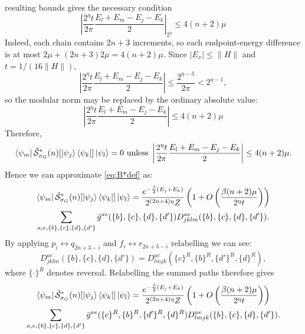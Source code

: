 \documentclass[aps,floatfix,10pt,amssymb,amsfont,amsmath,superscriptaddress,float,nofootinbib,longbibliography,nobalancelastpage,twocolumn]{revtex4-2}
\begin{document}
\begin{widetext}
resulting bounds gives the necessary condition
\begin{equation}
    \left|\frac{2^{\eta}t}{2\pi}\frac{E_l+E_m-E_j-E_k}{2}\right|_{2^{\eta}} \leq 4(n+2)\mu
\end{equation}
Indeed, each chain contains $2n+3$ increments, so each endpoint-energy
difference is at most $2\mu+(2n+3)2\mu=4(n+2)\mu$.  Since
$|E_x|\leq\|H\|$ and $t=1/(16\|H\|)$,
\begin{equation*}
    \left|\frac{2^{\eta}t}{2\pi}\frac{E_l+E_m-E_j-E_k}{2}\right|
    \leq \frac{2^{\eta-3}}{2\pi}<2^{\eta-1},
\end{equation*}
so the modular norm may be replaced by the ordinary absolute value:
\begin{equation}
\label{eq:energiessame}
    \left|\frac{2^{\eta}t}{2\pi}\frac{E_l+E_m-E_j-E_k}{2}\right| \leq 4(n+2)\mu
\end{equation}
Therefore,
\begin{equation}
    \bra{\psi_m}\tilde{\mathcal{S}}^*_{\sigma_G}(n)[\ket{\psi_j}\bra{\psi_k}]\ket{\psi_l} = 0 \text{ unless } \left|\frac{2^{\eta}t}{2\pi}\frac{E_l+E_m-E_j-E_k}{2}\right| \leq 4(n+2)\mu.
\end{equation}
Hence we can approximate \eqref{eq:B*def} as:
\begin{multline}
     \bra{\psi_m}\tilde{\mathcal{S}}^*_{\sigma_G}(n)[\ket{\psi_j}\bra{\psi_k}]\ket{\psi_l} = \frac{e^{-\frac{\beta}{2}(E_j+E_k)}}{2^{(2n+4)\eta}Z}\left(1+O\left(\frac{\beta(n+2)\mu}{2^\eta t}\right)\right)\\\sum_{a,e,\{b\},\{c\},\{d\},\{d'\}} \bar g^{ae}(\{b\},\{c\},\{d\},\{d'\}) D^{ae}_{jklm}(\{b\},\{c\},\{d\},\{d'\}).
\end{multline}
By applying $p_i \leftrightarrow q_{2n+3-i}$ and $f_i \leftrightarrow r_{2n+3-i}$ relabelling we can see:
\begin{equation*}
    D^{ae}_{jklm}(\{b\},\{c\},\{d\},\{d'\})
    =D^{ae}_{lmjk}(\{c\}^R,\{b\}^R,\{d'\}^R,\{d\}^R),
\end{equation*}
where $\{\cdot\}^R$ denotes reversal.
Relabelling the summed paths therefore gives
\begin{multline}
     \bra{\psi_m}\tilde{\mathcal{S}}^*_{\sigma_G}(n)[\ket{\psi_j}\bra{\psi_k}]\ket{\psi_l} = \frac{e^{-\frac{\beta}{2}(E_j+E_k)}}{2^{(2n+4)\eta}Z}\left(1+O\left(\frac{\beta(n+2)\mu}{2^\eta t}\right)\right)\\\sum_{a,e,\{b\},\{c\},\{d\},\{d'\}} \bar g^{ae}(\{c\}^R,\{b\}^R,\{d'\}^R,\{d\}^R) D^{ae}_{lmjk}(\{b\},\{c\},\{d\},\{d'\}).
     \label{eq:relabelline}

\end{multline}
\end{widetext}
\end{document}
